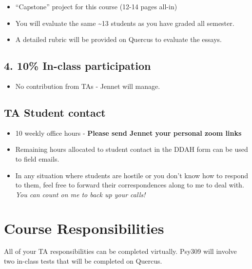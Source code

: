 \documentclass[
]{book}
\providecommand{\tightlist}{%
  \setlength{\itemsep}{0pt}\setlength{\parskip}{0pt}}
\begin{document}
\begin{itemize}
\tightlist
\item
  ``Capstone'' project for this course (12-14 pages all-in)
\item
  You will evaluate the same \textasciitilde13 students as you have graded all semester.
\item
  A detailed rubric will be provided on Quercus to evaluate the essays.
\end{itemize}

\subsection*{4. 10\% In-class participation}\label{in-class-participation}

\begin{itemize}
\tightlist
\item
  No contribution from TAs - Jennet will manage.
\end{itemize}

\subsection*{TA Student contact}\label{ta-student-contact}

\begin{itemize}
\item
  10 weekly office hours - \textbf{Please send Jennet your personal zoom links}
\item
  Remaining hours allocated to student contact in the DDAH form can be used to field emails.
\item
  In any situation where students are hostile or you don't know how to respond to them, feel free to forward their correspondences along to me to deal with. \emph{You can count on me to back up your calls!}
\end{itemize}

\section*{Course Responsibilities}\label{course-responsibilities}

All of your TA responsibilities can be completed virtually. Psy309 will involve two in-class tests that will be completed on Quercus.
\end{document}
